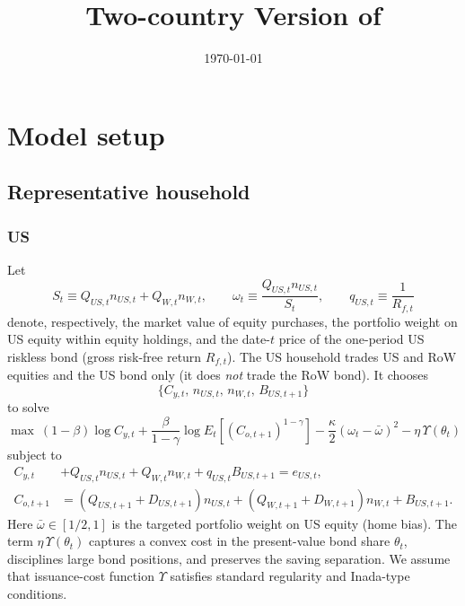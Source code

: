 \documentclass[12pt]{article}
\title{Two-country Version of \cite{hirano2025technological}
}
\author{
    }
\date{\today}
\theoremstyle{plain}
\begin{document}
{
\maketitle
}
\section{Model setup}

\subsection{Representative household}

\subsubsection{US}

Let
\[
S_t \equiv Q_{US,t}n_{US,t}+Q_{W,t}n_{W,t},
\qquad
\omega_t \equiv \frac{Q_{US,t}n_{US,t}}{S_t},
\qquad
q_{US,t}\equiv \frac{1}{R_{f,t}}
\]
denote, respectively, the market value of equity purchases, the portfolio weight on US equity within equity
holdings, and the date-$t$ price of the one-period US riskless bond (gross risk-free return $R_{f,t}$).
The US household trades US and RoW equities and the US bond only (it does \emph{not} trade the RoW bond).
It chooses
\[
\{C_{y,t},\,n_{US,t},\,n_{W,t},\,B_{US,t+1}\}
\]
to solve
\[
\max
\ (1-\beta)\log C_{y,t}
+\frac{\beta}{1-\gamma}\log E_t\!\left[(C_{o,t+1})^{1-\gamma}\right]
-\frac{\kappa}{2}(\omega_t-\bar\omega)^2
-\eta\,\Upsilon(\theta_t)
\]
subject to
\begin{align*}
C_{y,t}
&+Q_{US,t}n_{US,t}+Q_{W,t}n_{W,t}
+q_{US,t}B_{US,t+1}
= e_{US,t},\\
C_{o,t+1}
&=
(Q_{US,t+1}+D_{US,t+1})n_{US,t}
+(Q_{W,t+1}+D_{W,t+1})n_{W,t}
+B_{US,t+1}.
\end{align*}
Here $\bar\omega\in[1/2,1]$ is the targeted portfolio weight on US equity (home bias). The term
$\eta\,\Upsilon(\theta_t)$ captures a convex cost in the present-value bond share $\theta_t$,
disciplines large bond positions, and preserves the saving separation. We assume that issuance-cost function $\Upsilon$
 satisfies standard regularity and Inada-type conditions.
\end{document}
